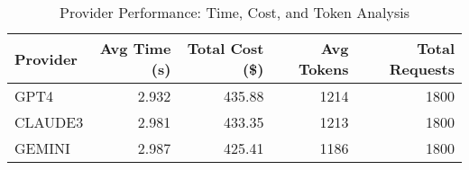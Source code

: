 \begin{table}[htbp]
\centering
\caption{Provider Performance: Time, Cost, and Token Analysis}
\label{tab:provider_performance}
\begin{tabular}{lrrrr}
\toprule
Provider & Avg Time (s) & Total Cost (\$) & Avg Tokens & Total Requests \\
\midrule
GPT4 & 2.932 & 435.88 & 1214 & 1800 \\
CLAUDE3 & 2.981 & 433.35 & 1213 & 1800 \\
GEMINI & 2.987 & 425.41 & 1186 & 1800 \\
\bottomrule
\end{tabular}
\end{table}